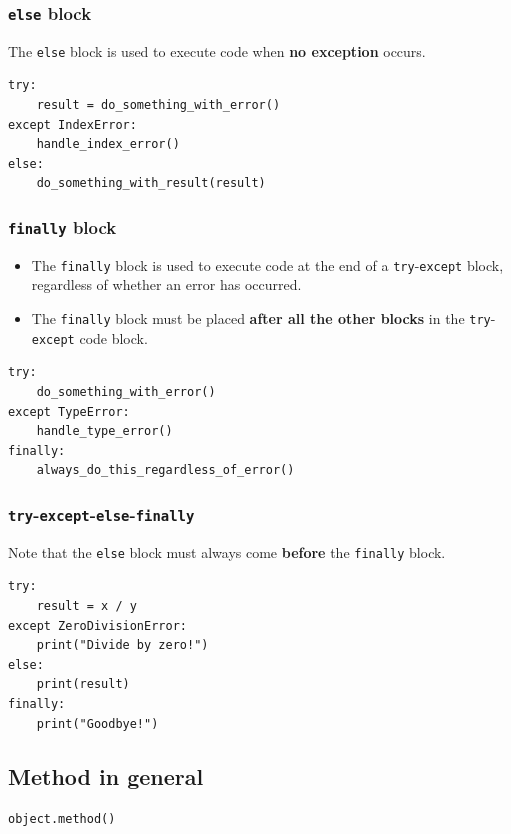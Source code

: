 \documentclass[11pt]{article}
\begin{document}
\subsubsection{\texttt{else} block}
\label{sec:org84864f8}
The \texttt{else} block is used to execute code when \textbf{no exception} occurs.

\begin{verbatim}
try:
    result = do_something_with_error()
except IndexError:
    handle_index_error()
else:
    do_something_with_result(result)
\end{verbatim}

 \newpage

\subsubsection{\texttt{finally} block}
\label{sec:orgd7d8ed8}
\begin{itemize}
\item The \texttt{finally} block is used to execute code at the end of a \texttt{try}-\texttt{except} block, regardless of whether an error has occurred.
\item The \texttt{finally} block must be placed \textbf{after all the other blocks} in the \texttt{try}-\texttt{except} code block.
\end{itemize}

\begin{verbatim}
try:
    do_something_with_error()
except TypeError:
    handle_type_error()
finally:
    always_do_this_regardless_of_error()
\end{verbatim}

\subsubsection{\texttt{try}-\texttt{except}-\texttt{else}-\texttt{finally}}
\label{sec:org0ab05d6}
Note that the \texttt{else} block must always come \textbf{before} the \texttt{finally} block.
\begin{verbatim}
try:
    result = x / y
except ZeroDivisionError:
    print("Divide by zero!")
else:
    print(result)
finally:
    print("Goodbye!")
\end{verbatim}

\subsection{Method in general}
\label{sec:org0befd5b}
\begin{verbatim}
object.method()
\end{verbatim}
\end{document}
